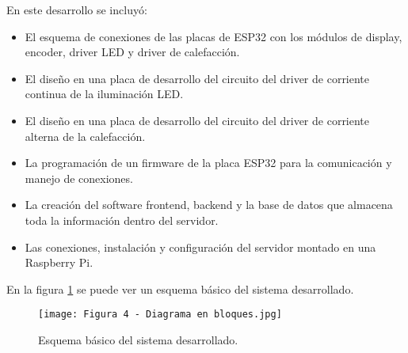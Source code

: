 En este desarrollo se incluyó:
\begin{itemize}
	\item El esquema de conexiones de las placas de ESP32 con los módulos de display, encoder, driver LED y driver de calefacción.
	\item El diseño en una placa de desarrollo del circuito del driver de corriente continua de la iluminación LED.
	\item El diseño en una placa de desarrollo del circuito del driver de corriente alterna de la calefacción.
	\item La programación de un firmware de la placa ESP32 para la comunicación y manejo de conexiones.
	\item La creación del software frontend, backend y la base de datos que almacena toda la información dentro del servidor.
	\item Las conexiones, instalación y configuración del servidor montado en una Raspberry Pi.
\end{itemize}

En la figura \ref{fig:4} se puede ver un esquema básico del sistema desarrollado.
\begin{figure}[h]
\centering
\texttt{[image: Figura 4 - Diagrama en bloques.jpg]}
\caption[Esquema básico del sistema desarrollado]{Esquema básico del sistema desarrollado. \protect}
\label{fig:4}
\end{figure}